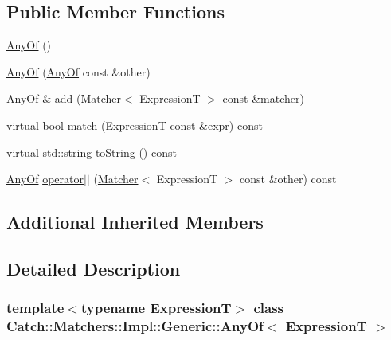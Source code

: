 \subsection*{Public Member Functions}
\begin{DoxyCompactItemize}
\item 
\hyperlink{class_catch_1_1_matchers_1_1_impl_1_1_generic_1_1_any_of_a131d84740c6b250ff7ef2213ae0de2aa}{Any\+Of} ()
\item 
\hyperlink{class_catch_1_1_matchers_1_1_impl_1_1_generic_1_1_any_of_a74fbc05b32d334fcbfd0fae0163a404e}{Any\+Of} (\hyperlink{class_catch_1_1_matchers_1_1_impl_1_1_generic_1_1_any_of}{Any\+Of} const \&other)
\item 
\hyperlink{class_catch_1_1_matchers_1_1_impl_1_1_generic_1_1_any_of}{Any\+Of} \& \hyperlink{class_catch_1_1_matchers_1_1_impl_1_1_generic_1_1_any_of_a3bce94b627551e5f96c5f9c6060413f0}{add} (\hyperlink{struct_catch_1_1_matchers_1_1_impl_1_1_matcher}{Matcher}$<$ ExpressionT $>$ const \&matcher)
\item 
virtual bool \hyperlink{class_catch_1_1_matchers_1_1_impl_1_1_generic_1_1_any_of_adebd5437cdb8e0d54e16e97fe26e7e85}{match} (ExpressionT const \&expr) const
\item 
virtual std\+::string \hyperlink{class_catch_1_1_matchers_1_1_impl_1_1_generic_1_1_any_of_a331aaf012b133682eadc9ed5342f848a}{to\+String} () const
\item 
\hyperlink{class_catch_1_1_matchers_1_1_impl_1_1_generic_1_1_any_of}{Any\+Of} \hyperlink{class_catch_1_1_matchers_1_1_impl_1_1_generic_1_1_any_of_a6dc9aee9a816f66ddc9de0c45c1c9ac1}{operator$\vert$$\vert$} (\hyperlink{struct_catch_1_1_matchers_1_1_impl_1_1_matcher}{Matcher}$<$ ExpressionT $>$ const \&other) const
\end{DoxyCompactItemize}
\subsection*{Additional Inherited Members}


\subsection{Detailed Description}
\subsubsection*{template$<$typename ExpressionT$>$\newline
class Catch\+::\+Matchers\+::\+Impl\+::\+Generic\+::\+Any\+Of$<$ Expression\+T $>$}



